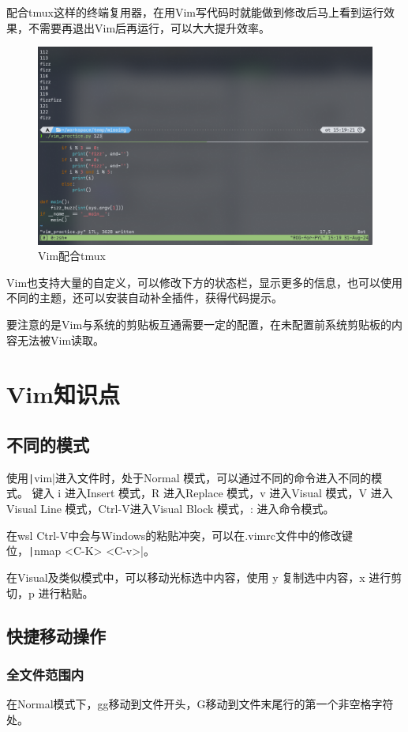 \documentclass[fontset=ubuntu]{ctexart}
\begin{document}
\begin{sloppypar}
配合tmux这样的终端复用器，在用Vim写代码时就能做到修改后马上看到运行效果，不需要再退出Vim后再运行，可以大大提升效率。
\begin{figure}[htb]
    \centering
    \includegraphics[width=0.75\linewidth]{vim_1.png}
    \caption{Vim配合tmux}
    \label{fig:vim_1}
\end{figure}

Vim也支持大量的自定义，可以修改下方的状态栏，显示更多的信息，也可以使用不同的主题，还可以安装自动补全插件，获得代码提示。

要注意的是Vim与系统的剪贴板互通需要一定的配置，在未配置前系统剪贴板的内容无法被Vim读取。

\section{Vim知识点}
\subsection{不同的模式}
使用\texttt|vim|进入文件时，处于Normal 模式，可以通过不同的命令进入不同的模式。
键入 i 进入Insert 模式，R 进入Replace 模式，v 进入Visual 模式，V 进入Visual Line 模式，Ctrl-V进入Visual Block 模式，: 进入命令模式。

在wsl Ctrl-V中会与Windows的粘贴冲突，可以在.vimrc文件中的修改键位，\texttt|nmap <C-K> <C-v>|。

在Visual及类似模式中，可以移动光标选中内容，使用 y 复制选中内容，x 进行剪切，p 进行粘贴。

\subsection{快捷移动操作}
\subsubsection{全文件范围内}
在Normal模式下，gg移动到文件开头，G移动到文件末尾行的第一个非空格字符处。


\end{sloppypar}
\end{document}
